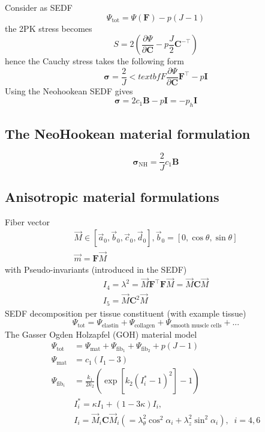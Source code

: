 \documentclass[../main.tex]{subfiles}
\begin{document}
Consider as SEDF
\begin{equation}
    \Psi_{\text{tot}} = \Psi(\textbf{F}) - p(J-1)
\end{equation}
the 2PK stress becomes
\begin{equation}
    S=2\left(\frac{\partial \Psi}{\partial \textbf{C}} - p \frac{J}{2}\textbf{C}^{-\top}\right)
\end{equation}
hence the Cauchy stress takes the following form
\begin{equation}
    \bm{\sigma} = \frac{2}{J}<textbf{F}\frac{\partial \Psi}{\partial \textbf{C}}\textbf{F}^{\top} - p \textbf{I}
\end{equation}
Using the Neohookean SEDF gives
\begin{equation}
    \bm{\sigma} = 2c_1\textbf{B} - p \textbf{I} = -p_h\textbf{I}
\end{equation}

\subsection{The NeoHookean material formulation}

\begin{equation}
    \bm{\sigma}_{\text{NH}} = \frac{2}{J}c_1\textbf{B}
\end{equation}

\subsection{Anisotropic material formulations}

Fiber vector
\begin{align}
    \vec{M} \in [\vec{a}_0, \vec{b}_0, \vec{c}_0, \vec{d}_0], \vec{b}_0 = [0,\cos\theta,\sin\theta]\\
    \vec{m} = \textbf{F}\vec{M}
\end{align}
with Pseudo-invariants (introduced in the SEDF)
\begin{align}
    I_4 = \lambda^2 = \vec{M}\textbf{F}^{\top}\textbf{F}\vec{M} = \vec{M}\textbf{C}\vec{M}\\
    I_5 = \vec{M}\textbf{C}^2\vec{M}
\end{align}
SEDF decomposition per tissue constituent (with example tissue)
\begin{equation}
    \Psi_{\text{tot}} = \Psi_{\text{elastin}} + \Psi_{\text{collagen}} + \Psi_{\text{smooth muscle cells}} + ...
\end{equation}
The Gasser Ogden Holzapfel (GOH) material model
\begin{align}
    \Psi_{\text{tot}} &= \Psi_{\text{mat}} + \Psi_{\text{fib}_1} + \Psi_{\text{fib}_2} + p(J-1)\\
    \Psi_{\text{mat}} &= c_1(I_1-3)\\
    \Psi_{\text{fib}_i} &= \frac{k_1}{2k_2}\left(\exp[k_2(I_i^*-1)^2]-1\right)\\
    & I_i^* = \kappa I_1 + (1-3\kappa)I_i,\\
    & I_i = \vec{M}_i\textbf{C}\vec{M}_i \left(= \lambda_{\theta}^2\cos^2\alpha_i+\lambda_z^2\sin^2\alpha_i\right),\;\; i=4, 6
\end{align}
\end{document}
